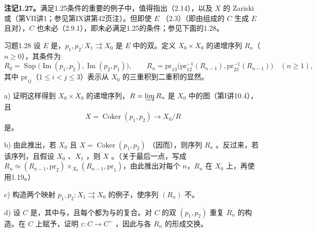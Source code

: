 \textbf{注记1.27。}满足1.25条件的重要的例子中，值得指出（2.14），以及 $X$ 的 Zariski 或（第VII讲1；参见第IX讲第42页注）。但即使 $E$ （2.3）（即由组成的 $C$ 生成 $E$ 且对），$C$ 也未必（2.9.1），即未必满足1.25的条件；参见下面的1.28。
\begin{SGAresult}{习题}{1.28}
设 $E$ 是，$p_1,p_2:X_1\rightrightarrows X_0$ 是 $E$ 中的双。定义 $X_0\times X_0$ 的递增序列 $R_n$（$n\geq0$），其条件为
\[
R_0=\operatorname{Sup}\bigl(\operatorname{Im}(p_1,p_2),\operatorname{Im}(p_2,p_1)\bigr),
\qquad
R_n=\mathrm{pr}_{13}\bigl(\mathrm{pr}_{12}^{-1}(R_{n-1}),\mathrm{pr}_{23}^{-1}(R_{n-1})\bigr)
\quad(n\geq1),
\]
其中 $\mathrm{pr}_{ij}$（$1\leq i<j\leq3$）表示从 $X_0$ 的三重积到二重积的显然。

a) 证明这样得到 $X_0\times X_0$ 的递增序列，$R=\varinjlim R_n$ 是 $X_0$ 中的图（第I讲10.4），且
\[
X=\operatorname{Coker}(p_1,p_2)\longrightarrow X_0/R
\]
是。

b) 由此推出，若 $X_0$ 且 $X=\operatorname{Coker}(p_1,p_2)$ （因而），则序列 $R_n$ 。反过来，若该序列，且假设 $X_0$ 、$X_1$ ，则 $X$ 。（关于最后一点，写成 $R_n\simeq(R_{n-1},\mathrm{pr}_2)\times_{X_0}(R_{n-1},\mathrm{pr}_1)$，由此推出对每个 $n$，$R_n$ 在 $X_0$ 上，再使用1.19。）

c) 构造两个映射 $p_1,p_2:X_1\rightrightarrows X_0$ 的例子，使序列 $(R_n)$ 不。

d) 设 $C$ 是，其中与，且每个都为与的复合。对 $C$ 的双 $(p_1,p_2)$ 重复 $R_n$ 的构造。在 $C$ 上赋予，证明 $\varepsilon:C\to C^{\sim}$ ，因此与各 $R_n$ 的形成交换。


\end{SGAresult}
